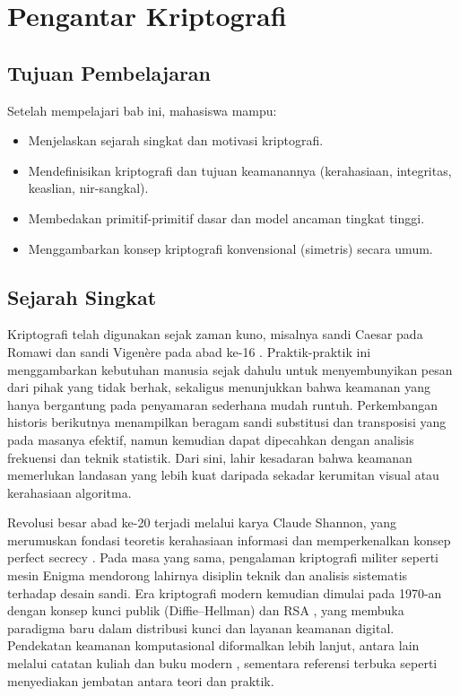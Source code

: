 \documentclass[../main.tex]{subfiles}
\begin{document}
\chapter{Pengantar Kriptografi}

\section{Tujuan Pembelajaran}
Setelah mempelajari bab ini, mahasiswa mampu:
\begin{itemize}
  \item Menjelaskan sejarah singkat dan motivasi kriptografi.
  \item Mendefinisikan kriptografi dan tujuan keamanannya (kerahasiaan, integritas, keaslian, nir-sangkal).
  \item Membedakan primitif-primitif dasar dan model ancaman tingkat tinggi.
  \item Menggambarkan konsep kriptografi konvensional (simetris) secara umum.
\end{itemize}

\section{Sejarah Singkat}
Kriptografi telah digunakan sejak zaman kuno, misalnya sandi Caesar pada Romawi dan sandi Vigen\`{e}re pada abad ke-16 \citep{wikipedia_caesar,wikipedia_vigenere}. Praktik-praktik ini menggambarkan kebutuhan manusia sejak dahulu untuk menyembunyikan pesan dari pihak yang tidak berhak, sekaligus menunjukkan bahwa keamanan yang hanya bergantung pada penyamaran sederhana mudah runtuh. Perkembangan historis berikutnya menampilkan beragam sandi substitusi dan transposisi yang pada masanya efektif, namun kemudian dapat dipecahkan dengan analisis frekuensi dan teknik statistik. Dari sini, lahir kesadaran bahwa keamanan memerlukan landasan yang lebih kuat daripada sekadar kerumitan visual atau kerahasiaan algoritma.

Revolusi besar abad ke-20 terjadi melalui karya Claude Shannon, yang merumuskan fondasi teoretis kerahasiaan informasi dan memperkenalkan konsep perfect secrecy \citep{shannon1949}. Pada masa yang sama, pengalaman kriptografi militer seperti mesin Enigma mendorong lahirnya disiplin teknik dan analisis sistematis terhadap desain sandi. Era kriptografi modern kemudian dimulai pada 1970-an dengan konsep kunci publik (Diffie--Hellman) dan RSA \citep{diffiehellman,rsa}, yang membuka paradigma baru dalam distribusi kunci dan layanan keamanan digital. Pendekatan keamanan komputasional diformalkan lebih lanjut, antara lain melalui catatan kuliah dan buku modern \citep{katzlindell,bonehshoup,bellare_rogaway_notes}, sementara referensi terbuka seperti \citep{menezes,stallings} menyediakan jembatan antara teori dan praktik.
\end{document}
